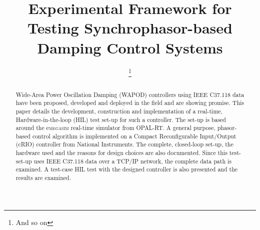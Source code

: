 \documentclass[conference]{IEEEtran}
\begin{document}
\title{Experimental Framework for Testing Synchrophasor-based Damping Control Systems}


\author{
\thanks{And so on}
\and
{}
\and
{}
}

\maketitle
\begin{abstract}
Wide-Area Power Oscillation Damping (WAPOD) controllers using IEEE C37.118 data have been proposed, developed and deployed in the field and are showing promise. This paper details the development, construction and implementation of a real-time, Hardware-in-the-loop (HIL) test set-up for such a controller. The set-up is based around the e\textsc{megasim} real-time simulator from OPAL-RT. A general purpose, phasor-based control algorithm is implemented on a Compact Reconfigurable Input/Output (cRIO) controller from National Instruments. The complete, closed-loop set-up, the hardware used and the reasons for design choices are also documented. Since this test-set-up uses IEEE C37.118 data over a TCP/IP network, the complete data path is examined. A test-case HIL test with the designed controller is also presented and the results are examined.

\end{abstract}


%
\IEEEpeerreviewmaketitle
\end{document}
